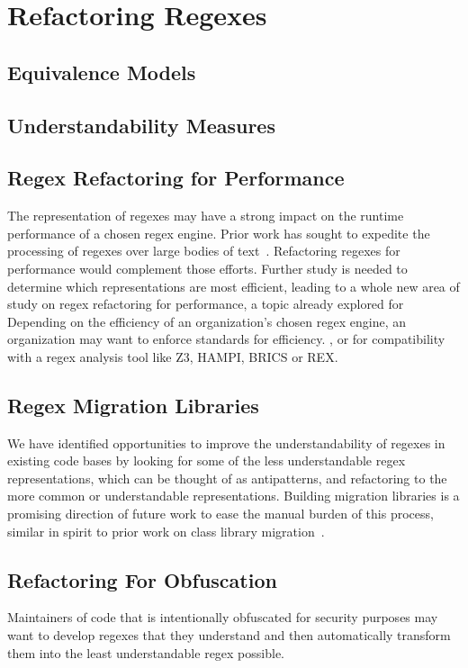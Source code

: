 \section{Refactoring Regexes}

\subsection{Equivalence Models}

\subsection{Understandability Measures}

\subsection{Regex Refactoring for Performance}
The representation of regexes may have a strong impact on the runtime performance of a chosen regex engine. Prior work has sought to expedite the processing of regexes over large bodies of text~\cite{Baeza-Yates:1996:FTS:235809.235810}.
Refactoring regexes for performance would complement those efforts.
Further study is needed to determine which representations are most efficient, leading to a whole new area of study on regex refactoring for performance, a topic already explored for
Depending on the efficiency of an organization's chosen regex engine, an organization may want to enforce standards for efficiency.
, or for compatibility with a regex analysis tool like Z3, HAMPI, BRICS or REX.

\subsection{Regex Migration Libraries}
We have identified opportunities
to improve the understandability of regexes in existing code bases by looking for some of the less understandable regex representations, which can be thought of as antipatterns, and refactoring to the more common or understandable representations.
Building migration libraries is a promising direction of future work to ease the manual burden of this process, similar in spirit to prior work on class library migration~\cite{Balaban:2005:RSC:1103845.1094832}.

\subsection{Refactoring For Obfuscation}
Maintainers of code that is intentionally obfuscated for security purposes may want to develop regexes that they understand and then automatically transform them into the least understandable regex possible.
